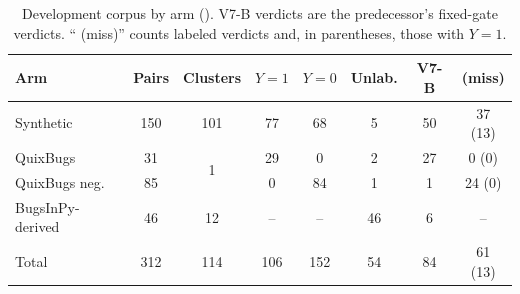 \begin{table}[!t]
\caption{Development corpus by arm (). V7-B verdicts are the predecessor's fixed-gate verdicts. ``\NDO{} (miss)'' counts labeled \NDO{} verdicts and, in parentheses, those with $Y{=}1$.}
\label{tab:corpus}
\centering
\scriptsize
\setlength{\tabcolsep}{2.5pt}
\begin{tabular}{|l|c|c|c|c|c|c|c|}
\hline
Arm & Pairs & Clusters & $Y{=}1$ & $Y{=}0$ & Unlab. & V7-B \DIV{} & \NDO{} (miss) \\
\hline
Synthetic & 150 & 101 & 77 & 68 & 5 & 50 & 37 (13) \\
QuixBugs & 31 & \multirow{2}{*}{1} & 29 & 0 & 2 & 27 & 0 (0) \\
QuixBugs neg. & 85 & & 0 & 84 & 1 & 1 & 24 (0) \\
BugsInPy-derived & 46 & 12 & -- & -- & 46 & 6 & -- \\
\hline
Total & 312 & 114 & 106 & 152 & 54 & 84 & 61 (13) \\
\hline
\end{tabular}
\end{table}
